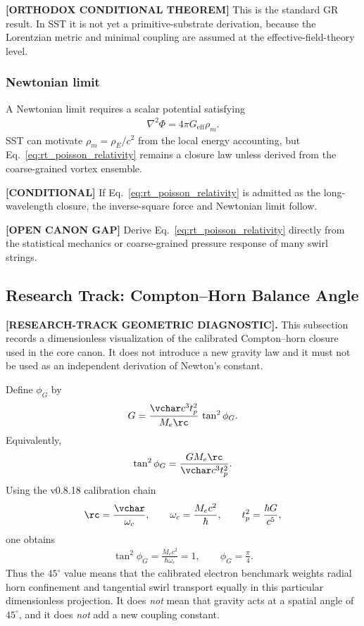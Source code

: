 \textbf{[ORTHODOX CONDITIONAL THEOREM]} This is the standard GR result. In SST
it is not yet a primitive-substrate derivation, because the Lorentzian metric
and minimal coupling are assumed at the effective-field-theory level.

\subsubsection{Newtonian limit}

A Newtonian limit requires a scalar potential satisfying
\begin{align}
    \nabla^2 \Phi
    =
    4\pi G_{\mathrm{eff}}\rho_{\!m}.
    \label{eq:rt_poisson_relativity}
\end{align}
SST can motivate \(\rho_{\!m}=\rho_{\!E}/c^2\) from the local energy accounting,
but Eq.~\eqref{eq:rt_poisson_relativity} remains a closure law unless derived from the
coarse-grained vortex ensemble.

\textbf{[CONDITIONAL]} If Eq.~\eqref{eq:rt_poisson_relativity} is admitted as the
long-wavelength closure, the inverse-square force and Newtonian limit follow.

\textbf{[OPEN CANON GAP]} Derive Eq.~\eqref{eq:rt_poisson_relativity} directly from the
statistical mechanics or coarse-grained pressure response of many swirl strings.

\subsection{Research Track: Compton--Horn Balance Angle}
\label{sec:rt_compton_horn_balance_angle}

\textbf{[RESEARCH-TRACK GEOMETRIC DIAGNOSTIC].}
This subsection records a dimensionless visualization of the calibrated
Compton--horn closure used in the core canon.  It does not introduce a new
gravity law and it must not be used as an independent derivation of
Newton's constant.

Define \(\phi_G\) by
\begin{align}
    G
    =
    \frac{\vchar c^3t_p^2}{M_e\rc}\,\tan^2\phi_G .
    \label{eq:rt_balance_angle_definition}
\end{align}
Equivalently,
\begin{align}
    \tan^2\phi_G
    =
    \frac{GM_e\rc}{\vchar c^3t_p^2}.
    \label{eq:rt_balance_angle_value}
\end{align}
Using the v0.8.18 calibration chain
\begin{align}
    \rc=\frac{\vchar}{\omega_c},
    \qquad
    \omega_c=\frac{M_ec^2}{\hbar},
    \qquad
    t_p^2=\frac{\hbar G}{c^5},
\end{align}
one obtains
\begin{align}
    \tan^2\phi_G
    =
    \frac{M_ec^2}{\hbar\omega_c}
    =1,
    \qquad
    \phi_G=\frac{\pi}{4}.
    \label{eq:rt_balance_angle_pi_over_four}
\end{align}
Thus the \(45^\circ\) value means that the calibrated electron benchmark
weights radial horn confinement and tangential swirl transport equally in this
particular dimensionless projection.  It does \emph{not} mean that gravity acts
at a spatial angle of \(45^\circ\), and it does \emph{not} add a new coupling
constant.

